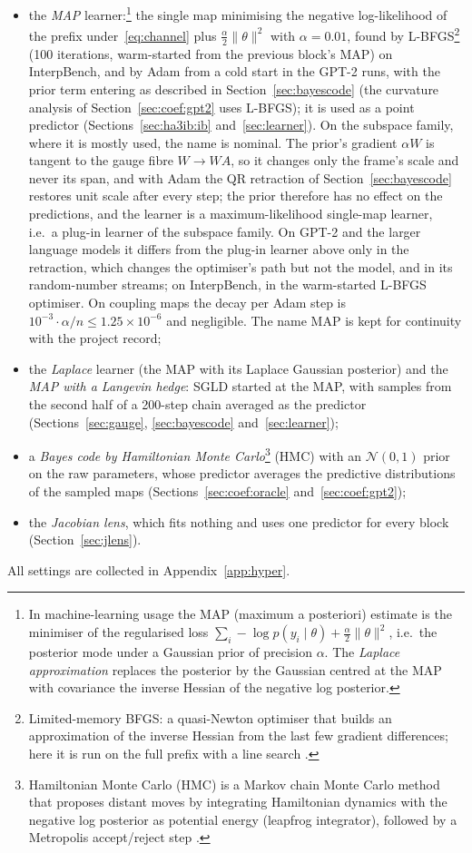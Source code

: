 \documentclass[11pt,a4paper]{article}
\begin{document}
\begin{itemize}
\item the \emph{MAP} learner:\footnote{In machine-learning usage the MAP (maximum a posteriori) estimate is the minimiser of the regularised loss $\sum_i-\log p(y_i\mid\theta)+\tfrac\alpha2\|\theta\|^2$, i.e.\ the posterior mode under a Gaussian prior of precision $\alpha$. The \emph{Laplace approximation} replaces the posterior by the Gaussian centred at the MAP with covariance the inverse Hessian of the negative log posterior.} the single map minimising the negative log-likelihood of the prefix under~\eqref{eq:channel} plus $\tfrac\alpha2\|\theta\|^2$ with $\alpha=0.01$, found by L-BFGS\footnote{Limited-memory BFGS: a quasi-Newton optimiser that builds an approximation of the inverse Hessian from the last few gradient differences; here it is run on the full prefix with a line search \cite{liu1989lbfgs}.} (100 iterations, warm-started from the previous block's MAP) on InterpBench, and by Adam from a cold start in the GPT-2 runs, with the prior term entering as described in Section~\ref{sec:bayescode} (the curvature analysis of Section~\ref{sec:coef:gpt2} uses L-BFGS); it is used as a point predictor (Sections~\ref{sec:ha3ib:ib} and~\ref{sec:learner}). On the subspace family, where it is mostly used, the name is nominal. The prior's gradient $\alpha W$ is tangent to the gauge fibre $W\to WA$, so it changes only the frame's scale and never its span, and with Adam the QR retraction of Section~\ref{sec:bayescode} restores unit scale after every step; the prior therefore has no effect on the predictions, and the learner is a maximum-likelihood single-map learner, i.e.\ a plug-in learner of the subspace family. On GPT-2 and the larger language models it differs from the plug-in learner above only in the retraction, which changes the optimiser's path but not the model, and in its random-number streams; on InterpBench, in the warm-started L-BFGS optimiser. On coupling maps the decay per Adam step is $10^{-3}\cdot\alpha/n\le1.25\times10^{-6}$ and negligible. The name MAP is kept for continuity with the project record;
\item the \emph{Laplace} learner (the MAP with its Laplace Gaussian posterior) and the \emph{MAP with a Langevin hedge}: SGLD started at the MAP, with samples from the second half of a 200-step chain averaged as the predictor (Sections~\ref{sec:gauge}, \ref{sec:bayescode} and~\ref{sec:learner});
\item a \emph{Bayes code by Hamiltonian Monte Carlo}\footnote{Hamiltonian Monte Carlo (HMC) is a Markov chain Monte Carlo method that proposes distant moves by integrating Hamiltonian dynamics with the negative log posterior as potential energy (leapfrog integrator), followed by a Metropolis accept/reject step \cite{neal2011hmc}.} (HMC) with an $\mathcal N(0,1)$ prior on the raw parameters, whose predictor averages the predictive distributions of the sampled maps (Sections~\ref{sec:coef:oracle} and~\ref{sec:coef:gpt2});
\item the \emph{Jacobian lens}, which fits nothing and uses one predictor for every block (Section~\ref{sec:jlens}).
\end{itemize}
All settings are collected in Appendix~\ref{app:hyper}.
\end{document}
